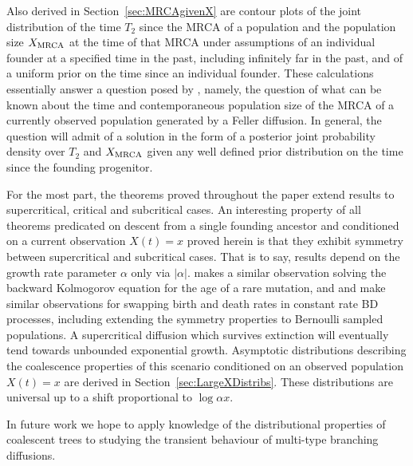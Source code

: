 \documentclass[preprint,12pt]{elsarticle}
\begin{document}
Also derived in Section~\ref{sec:MRCAgivenX} are contour plots of the joint distribution of the time $T_2$ since the MRCA of a population and the population 
size $X_{\rm MRCA}$ at the time of that MRCA under assumptions of an individual founder at a specified time in the past, including infinitely far in the past, 
and of a uniform prior on the time since an individual founder.  
These calculations essentially answer a question posed by \cite{BurdenSoewongsoso19}, namely, the question of what can be known about the time and 
contemporaneous population size of the MRCA of a currently observed population generated by a Feller diffusion.   In general, the question will admit of a solution 
in the form of a posterior joint probability density over $T_2$ and $X_{\rm MRCA}$ given any well defined prior distribution on the time since the founding progenitor. 

For the most part, the theorems proved throughout the paper extend results to supercritical, critical and subcritical cases.  An interesting property of all 
theorems predicated on descent from a single founding ancestor and conditioned on a current observation $X(t) = x$ proved herein is 
that they exhibit symmetry between supercritical and subcritical cases.  That is to say, results depend on the growth rate parameter $\alpha$ only via $|\alpha|$.  
\citet{Maruyama74} makes a similar observation solving the backward Kolmogorov equation for the age of a rare mutation, and \citet[Section~6.1]{Wiuf18} 
and \citet{Stadler19} make similar observations for swapping birth and death rates in constant rate BD processes, 
including extending the symmetry properties to Bernoulli sampled populations.  
A supercritical diffusion which survives extinction will eventually tend towards unbounded exponential growth.  Asymptotic distributions describing the coalescence 
properties of this scenario conditioned on an observed population $X(t) = x$ are derived in Section~\ref{sec:LargeXDistribs}.  These distributions 
are universal up to a shift proportional to $\log \alpha x$.  

In future work we hope to apply knowledge of the distributional properties of coalescent trees to studying the transient behaviour of multi-type branching 
diffusions.  

%
\appendix

%
%
\end{document}
